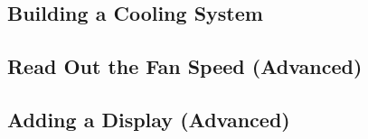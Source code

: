 \subsection{Building a Cooling System}

\subsection{Read Out the Fan Speed (Advanced)}

\subsection{Adding a Display (Advanced)}











